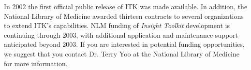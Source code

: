 In 2002 the first official public release of ITK was made available. In
addition, the National Library of Medicine awarded thirteen contracts to
several organizations to extend ITK's capabilities. NLM funding of 
\emph{Insight Toolkit} development is continuing through 2003, with additional
application and maintenance support anticipated beyond 2003. If you are 
interested in potential funding opportunities, we suggest that you contact
Dr. Terry Yoo at the National Library of Medicine for more information.
